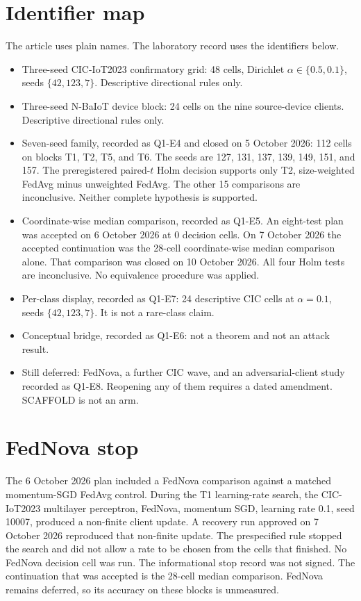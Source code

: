 \documentclass[11pt]{article}
\begin{document}
\section{Identifier map}
The article uses plain names. The laboratory record uses the identifiers below.
\begin{itemize}
\item Three-seed CIC-IoT2023 confirmatory grid: 48 cells, Dirichlet $\alpha\in\{0.5,0.1\}$, seeds $\{42,123,7\}$. Descriptive directional rules only.
\item Three-seed N-BaIoT device block: 24 cells on the nine source-device clients. Descriptive directional rules only.
\item Seven-seed family, recorded as Q1-E4 and closed on 5 October 2026: 112 cells on blocks T1, T2, T5, and T6. The seeds are 127, 131, 137, 139, 149, 151, and 157. The preregistered paired-$t$ Holm decision supports only T2, size-weighted FedAvg minus unweighted FedAvg. The other 15 comparisons are inconclusive. Neither complete hypothesis is supported.
\item Coordinate-wise median comparison, recorded as Q1-E5. An eight-test plan was accepted on 6 October 2026 at 0 decision cells. On 7 October 2026 the accepted continuation was the 28-cell coordinate-wise median comparison alone. That comparison was closed on 10 October 2026. All four Holm tests are inconclusive. No equivalence procedure was applied.
\item Per-class display, recorded as Q1-E7: 24 descriptive CIC cells at $\alpha=0.1$, seeds $\{42,123,7\}$. It is not a rare-class claim.
\item Conceptual bridge, recorded as Q1-E6: not a theorem and not an attack result.
\item Still deferred: FedNova, a further CIC wave, and an adversarial-client study recorded as Q1-E8. Reopening any of them requires a dated amendment. SCAFFOLD is not an arm.
\end{itemize}

\section{FedNova stop}
The 6 October 2026 plan included a FedNova comparison against a matched momentum-SGD FedAvg control. During the T1 learning-rate search, the CIC-IoT2023 multilayer perceptron, FedNova, momentum SGD, learning rate 0.1, seed 10007, produced a non-finite client update. A recovery run approved on 7 October 2026 reproduced that non-finite update. The prespecified rule stopped the search and did not allow a rate to be chosen from the cells that finished. No FedNova decision cell was run. The informational stop record was not signed. The continuation that was accepted is the 28-cell median comparison. FedNova remains deferred, so its accuracy on these blocks is unmeasured.
\end{document}
